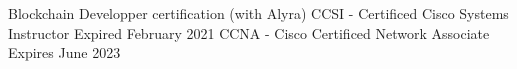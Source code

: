 
\begin{cvskills}
  \cvskill
    {Blockchain Developper certification (with Alyra)}
    {}
  \cvskill
    {CCSI - Certificed Cisco Systems Instructor}
    {Expired February 2021}
  \cvskill
    {CCNA - Cisco Certificed Network Associate}
    {Expires June 2023}
\end{cvskills}